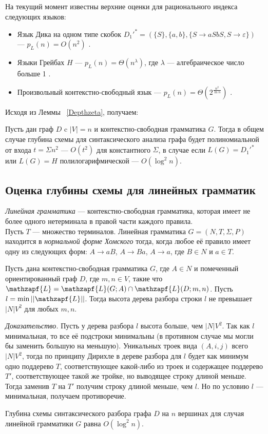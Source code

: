 На текущий момент известны верхние оценки для рационального индекса следующих языков:
\begin{itemize}
	\item Язык Дика  на одном типе скобок $D_1'^* = (\{S\}, \{a, b\}, \{S \rightarrow aSbS, S \rightarrow \varepsilon\})$ --- $p_L(n) = O(n^2)$ \cite{Dyck1}.
	\item Языки Грейбах $H$ --- $p_L(n) = \Theta(n^\lambda)$, где  $\lambda$ --- алгебраическое число больше 1 \cite{GreibRat}.
	\item Произвольный контекстно-свободный язык --- $p_L(n) = \Theta(2^ {\frac{n^2}{\ln n}})$ \cite{CFRat}.
\end{itemize}
Исходя из Леммы ~\ref{Depthzeta}, получаем:
\begin{corollaryrus} Пусть дан граф $D$ c $|V|=n$ и контекстно-свободная грамматика $G$. Тогда в общем случае глубина схемы для синтаксического анализа графа будет полиномиальной от входа $t = \Sigma n^2$ --- $O(t^2)$ для константного $\Sigma$, в случае если $L(G) = D_1'^*$ или $L(G) = H$ полилогарифмической  --- $O(\log^2 n)$.
\end{corollaryrus}

\subsection{Оценка глубины схемы для линейных грамматик}
\textit{Линейная грамматика} --- контекстно-свободная грамматика, которая имеет не более одного нетерминала в правой части каждого правила.
\\Пусть $T$ --- множество терминалов. Линейная грамматика $G = (N, T, \Sigma, P)$ находится в \textit{нормальной форме Хомского} тогда, когда любое её правило имеет  одну из следующих форм: $A \rightarrow aB$, $A \rightarrow Ba$, $A \rightarrow a$, где $B \in N$ и $a \in T$.
\begin{lemmarus}\label{Heightlem} Пусть дана контекстно-свободная грамматика $G$, где $A \in N$  и помеченный ориентированный граф $D$, где $m, n \in V$, такие что  $\mathzapf{L} = \mathzapf{L}(G; A) \cap  \mathzapf{L}(D; m, n)$. Пусть $l = \min ||\mathzapf{L}||$. Тогда высота дерева разбора строки  $l$ не превышает $|N|V^2$ для любых  $m, n$.
\end{lemmarus}
\textit{Доказательство.} Пусть у дерева разбора $l$ высота больше, чем $|N|V^2$. Так как $l$ минимальная, то все её подстроки минимальны (в противном случае мы могли бы заменить большую на меньшую). Уникальных троек вида $(A, i, j)$ всего $|N|V^2$, тогда по принципу Дирихле в дереве разбора для $l$ будет как минимум одно поддерево $T$, соответствующее какой-либо из троек  и  содержащее поддерево $T'$, соответствующее такой же тройке, но выводящее строку длиной меньше. Тогда заменив  $T$ на $T'$ получим строку длиной меньше, чем $l$. Но по условию $l$ --- минимальная, получаем противоречие.
\begin{theoremrus}
Глубина схемы синтаксического разбора графа $D$ на $n$ вершинах для случая линейной грамматики $G$ равна $O(\log^2 n)$.
\end{theoremrus}

